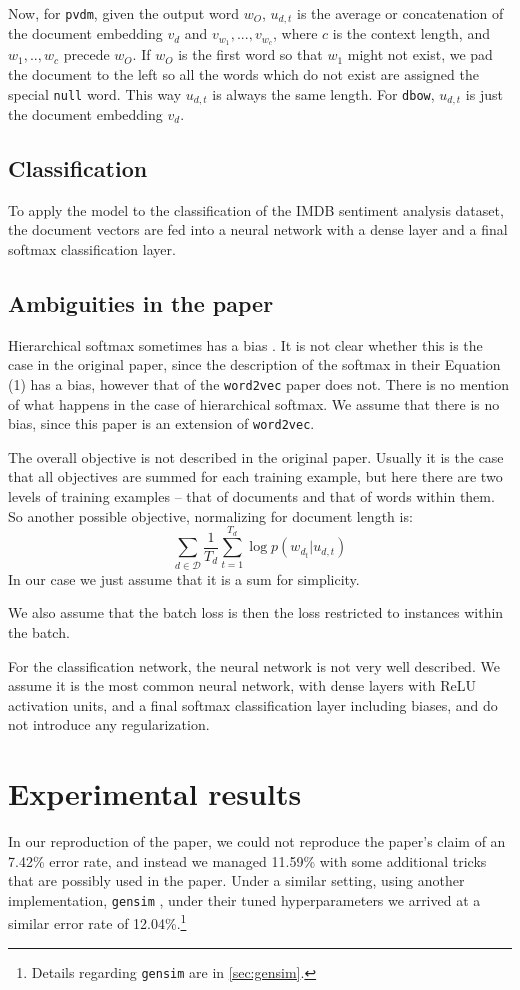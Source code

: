 \documentclass{article}
\begin{document}
Now, for \texttt{pvdm}, given the output word $w_O$, $u_{d,t}$ is the average or concatenation of the document embedding $v_d$ and $v_{w_1},...,v_{w_c}$, where $c$ is the context length, and $w_1,..,w_c$ precede $w_O$. If $w_O$ is the first word so that $w_1$ might not exist, we pad the document to the left so all the words which do not exist are assigned the special \texttt{null} word. This way $u_{d,t}$ is always the same length. For \texttt{dbow}, $u_{d,t}$ is just the document embedding $v_d$.

\subsection{Classification}
To apply the model to the classification of the IMDB sentiment analysis dataset, the document vectors are fed into a neural network with a dense layer and a final softmax classification layer.

\subsection{Ambiguities in the paper}
Hierarchical softmax sometimes has a bias \citep{mnih_scalable_2009}. It is not clear whether this is the case in the original paper, since the description of the softmax in their Equation (1) has a bias, however that of the \texttt{word2vec} paper does not. There is no mention of what happens in the case of hierarchical softmax. We assume that there is no bias, since this paper is an extension of \texttt{word2vec}.

The overall objective is not described in the original paper. Usually it is the case that all objectives are summed for each training example, but here there are two levels of training examples -- that of documents and that of words within them. So another possible objective, normalizing for document length is:
    \[\sum_{d\in\mathcal{D}}\frac{1}{T_d}\sum_{t=1}^{T_d} \log p(w_{d_t}|u_{d,t})\]
In our case we just assume that it is a sum for simplicity.

We also assume that the batch loss is then the loss restricted to instances within the batch.

For the classification network, the neural network is not very well described. We assume it is the most common neural network, with dense layers with ReLU activation units, and a final softmax classification layer including biases, and do not introduce any regularization.

\section{Experimental results}
In our reproduction of the paper, we could not reproduce the paper's claim of an 7.42\% error rate, and instead we managed 11.59\% with some additional tricks that are possibly used in the paper. Under a similar setting, using another implementation, \texttt{gensim} \citep{rehurek_software_2010}, under their tuned hyperparameters we arrived at a similar error rate of 12.04\%.\footnote{Details regarding \texttt{gensim} are in \autoref{sec:gensim}.}
\end{document}
